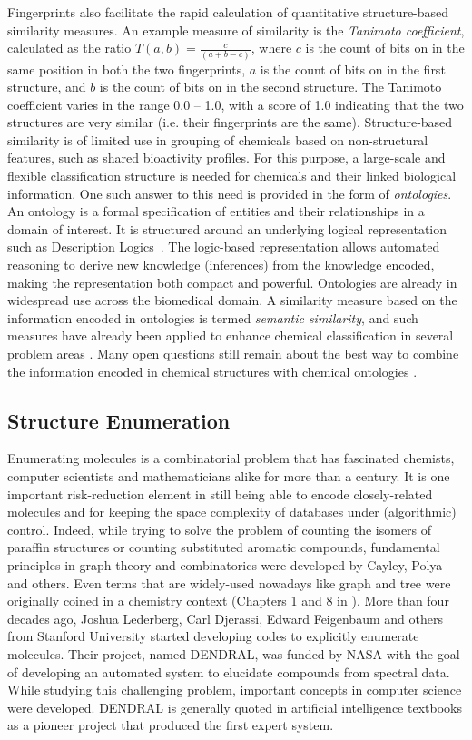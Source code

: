\documentclass{sig-alternate}
\begin{document}
Fingerprints also facilitate the rapid calculation of quantitative
structure-based similarity measures. An example measure of similarity is the
\emph{Tanimoto coefficient}, calculated as the ratio $T(a,b) = \frac{c}{(a+b-c)}$,
where $c$ is the count of bits on in the same position in both the two
fingerprints, $a$ is the count of bits on in the first structure, and $b$ is the
count of bits on in the second structure. The Tanimoto coefficient varies in the
range 0.0 -- 1.0, with a score of 1.0 indicating that the two structures are very
similar (i.e. their fingerprints are the same). Structure-based similarity is of
limited use in grouping of chemicals based on non-structural features, such as
shared bioactivity profiles. For this purpose, a large-scale and flexible
classification structure is needed for chemicals and their linked biological
information. One such answer to this need is provided in the form of \emph{ontologies}.
An ontology is a formal specification of entities and their relationships in a
domain of interest. It is structured around an underlying logical representation
such as Description Logics~\cite{baaderdl2007}. The logic-based representation allows
automated reasoning to derive new knowledge (inferences) from the knowledge
encoded, making the representation both compact and powerful.
Ontologies are already in widespread use across the biomedical domain. A
similarity measure based on the information encoded in ontologies is termed
\emph{semantic similarity}, and such measures have already been applied to enhance
chemical classification in several problem areas \cite{couto2010}. Many open
questions still remain about the best way to combine the information encoded in
chemical structures with chemical ontologies \cite{hastingsowled2010}.

\subsection{Structure Enumeration}
\label{sec:struct-enum}

Enumerating molecules is a combinatorial problem that has fascinated
chemists, computer scientists and mathematicians alike for more than a
century. It is one important risk-reduction element in still being
able to encode closely-related molecules and for keeping the space
complexity of databases under (algorithmic) control. Indeed, while
trying to solve the problem of counting the isomers of paraffin
structures or counting substituted aromatic compounds, fundamental
principles in graph theory and combinatorics were developed by Cayley,
Polya and others. Even terms that are widely-used nowadays like graph
and tree were originally coined in a chemistry context (Chapters 1 and
8 in \cite{faulon2010}). More than four decades ago, Joshua Lederberg,
Carl Djerassi, Edward Feigenbaum and others from Stanford University
started developing codes to explicitly enumerate molecules. Their
project, named DENDRAL, was funded by NASA with the goal of developing
an automated system to elucidate compounds from spectral data. While
studying this challenging problem, important concepts in computer
science were developed. DENDRAL is generally quoted in artificial
intelligence textbooks as a pioneer project that produced the first
expert system.
\end{document}
